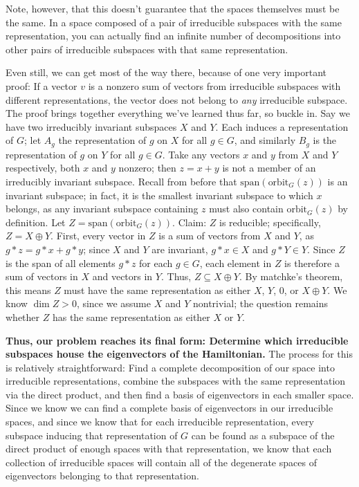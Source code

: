 \documentclass{article}
\begin{document}
Note, however, that this doesn't guarantee that the spaces themselves must be the same. In a space composed of a pair of irreducible subspaces with the same representation, you can actually find an infinite number of decompositions into other pairs of irreducible subspaces with that same representation.

Even still, we can get most of the way there, because of one very important proof: If a vector $v$ is a nonzero sum of vectors from irreducible subspaces with different representations, the vector does not belong to \textit{any} irreducible subspace. The proof brings together everything we've learned thus far, so buckle in. Say we have two irreducibly invariant subspaces $X$ and $Y$. Each induces a representation of $G$; let $A_g$ the representation of $g$ on $X$  for all $g \in G$, and similarly $B_g$ is the representation of $g$ on $Y$ for all $g\in G$. Take any vectors $x$ and $y$ from $X$ and $Y$ respectively, both $x$ and $y$ nonzero; then $z = x + y$ is not a member of an irreducibly invariant subspace. Recall from before that $\text{span}(\text{orbit}_G(z))$ is an invariant subspace; in fact, it is the smallest invariant subspace to which $x$ belongs, as any invariant subspace containing $z$ must also contain $\text{orbit}_G(z)$ by definition. Let $Z = \text{span}(\text{orbit}_G(z))$. Claim: $Z$ is reducible; specifically, $Z = X \oplus Y$. First, every vector in $Z$ is a sum of vectors from $X$ and $Y$, as $g*z = g*x + g*y$; since $X$ and $Y$ are invariant, $g*x \in X$ and $g*Y \in Y$. Since $Z$ is the span of all elements $g*z$ for each $g \in G$, each element in $Z$ is therefore a sum of vectors in $X$ and vectors in $Y$. Thus, $Z \subseteq X \oplus Y$. By matchke's theorem, this means $Z$ must have the same representation as either $X$, $Y$, ${0}$, or $X \oplus Y$. We know $\operatorname{dim}Z > 0$, since we assume $X$ and $Y$ nontrivial; the question remains whether $Z$ has the same representation as either $X$ or $Y$.



\textbf{Thus, our problem reaches its final form: Determine which irreducible subspaces house the eigenvectors of the Hamiltonian.} The process for this is relatively straightforward: Find a complete decomposition of our space into irreducible representations, combine the subspaces with the same representation via the direct product, and then find a basis of eigenvectors in each smaller space. Since we know we can find a complete basis of eigenvectors in our irreducible spaces, and since we know that for each irreducible representation, every subspace inducing that representation of $G$ can be found as a subspace of the direct product of enough spaces with that representation, we know that each collection of irreducible spaces will contain all of the degenerate spaces of eigenvectors belonging to that representation. 
\end{document}
